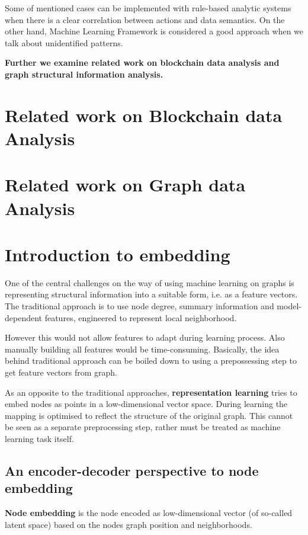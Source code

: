 Some of mentioned cases can be implemented with rule-based analytic systems when there is a clear correlation between actions and data semantics. On the other hand, Machine Learning Framework is considered a good approach when we talk about unidentified patterns.

\textbf{Further we examine related work on blockchain data analysis and graph structural information analysis.}

\section{Related work on Blockchain data Analysis}

\section{Related work on Graph data Analysis}

\section{Introduction to embedding}

One of the central challenges on the way of using machine learning on graphs is representing structural information into a suitable form, i.e. as a feature vectors. The traditional approach is to use node degree, summary information and model-dependent features, engineered to represent local neighborhood. 

However this would not allow features to adapt during learning process. Also manually building all features would be time-consuming. Basically, the idea behind traditional approach can be boiled down to using a prepossessing step to get feature vectors from graph.

As an opposite to the traditional approaches, \textbf{representation learning} tries to embed nodes as points in a low-dimensional vector space. During learning the mapping is optimised to reflect the structure of the original graph. This cannot be seen as a separate preprocessing step, rather must be treated as machine learning task itself.

\subsection{An encoder-decoder perspective to node embedding}

\textbf{Node embedding} is the node encoded as low-dimensional vector (of so-called latent space) based on the nodes graph position and neighborhoods.

